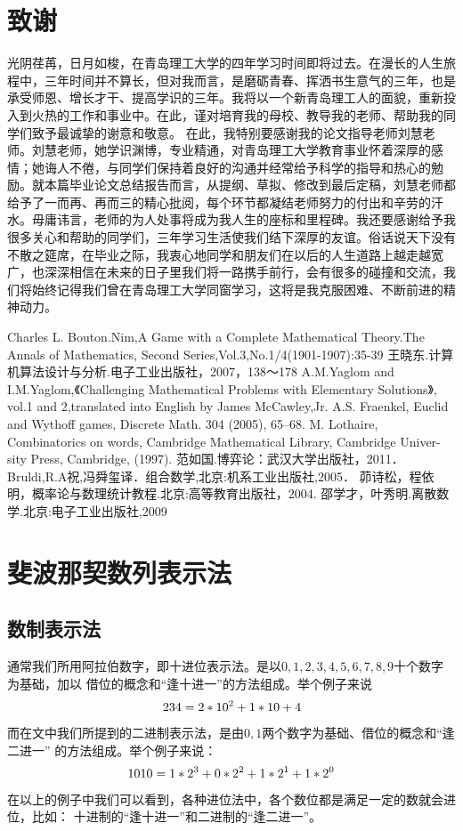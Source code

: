 \documentclass[UTF8,nofonts,cs4size]{ctexrep}
\begin{document}
\chapter*{致谢}
光阴荏苒，日月如梭，在青岛理工大学的四年学习时间即将过去。在漫长的人生旅程中，三年时间并不算长，但对我而言，是磨砺青春、挥洒书生意气的三年，也是承受师恩、增长才干、提高学识的三年。我将以一个新青岛理工人的面貌，重新投入到火热的工作和事业中。在此，谨对培育我的母校、教导我的老师、帮助我的同学们致予最诚挚的谢意和敬意。 在此，我特别要感谢我的论文指导老师刘慧老师。刘慧老师，她学识渊博，专业精通，对青岛理工大学教育事业怀着深厚的感情；她诲人不倦，与同学们保持着良好的沟通并经常给予科学的指导和热心的勉励。就本篇毕业论文总结报告而言，从提纲、草拟、修改到最后定稿，刘慧老师都给予了一而再、再而三的精心批阅，每个环节都凝结老师努力的付出和辛劳的汗水。毋庸讳言，老师的为人处事将成为我人生的座标和里程碑。我还要感谢给予我很多关心和帮助的同学们，三年学习生活使我们结下深厚的友谊。俗话说天下没有不散之筵席，在毕业之际，我衷心地同学和朋友们在以后的人生道路上越走越宽广，也深深相信在未来的日子里我们将一路携手前行，会有很多的碰撞和交流，我们将始终记得我们曾在青岛理工大学同窗学习，这将是我克服困难、不断前进的精神动力。
\begin{thebibliography}{99}
Charles L. Bouton.Nim,A Game with a Complete Mathematical Theory.The Annals of Mathematics, Second Series,Vol.3,No.1/4(1901-1907):35-39
王晓东.计算机算法设计与分析.电子工业出版社，2007，138～178
A.M.Yaglom and I.M.Yaglom,《Challenging Mathematical Problems with Elementary Solutions》, vol.1 and 2,translated into English by James McCawley,Jr.
A.S. Fraenkel, Euclid and Wythoff games, Discrete Math. 304 (2005), 65–68.
M. Lothaire, Combinatorics on words, Cambridge Mathematical Library, Cambridge Univer-sity Press, Cambridge, (1997).
范如国.博弈论：武汉大学出版社，2011．
Bruldi,R.A祝,冯舜玺译．组合数学,北京:机系工业出版社,2005．
茆诗松，程依明，概率论与数理统计教程.北京:高等教育出版社，2004.
邵学才，叶秀明.离散数学.北京:电子工业出版社,2009

\end{thebibliography}
\appendix
\chapter{斐波那契数列表示法}
\section{数制表示法}
通常我们所用阿拉伯数字，即十进位表示法。是以$0,1,2,3,4,5,6,7,8,9$十个数字为基础，加以
借位的概念和“逢十进一”的方法组成。举个例子来说
\begin{equation}
    234=2*10^2 + 1*10 + 4 \notag
\end{equation}
而在文中我们所提到的二进制表示法，是由$0,1$两个数字为基础、借位的概念和“逢二进一”
的方法组成。举个例子来说：
\begin{equation}
    1010=1*2^3 + 0*2^2 +1*2^1+1*2^0 \notag
\end{equation}
在以上的例子中我们可以看到，各种进位法中，各个数位都是满足一定的数就会进位，比如：
十进制的“逢十进一”和二进制的“逢二进一”。
\end{document}
